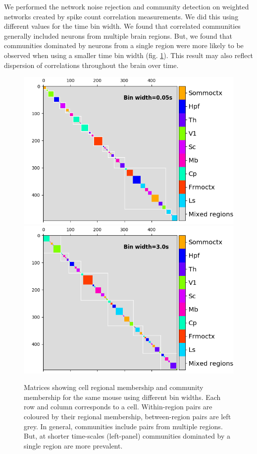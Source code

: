 \documentclass[a4paper,12pt]{article}
\theoremstyle{definition}
\begin{document}
We performed the network noise rejection and community detection on weighted networks created by spike count correlation measurements. We did this using different values for the time bin width. We found that correlated communities generally included neurons from multiple brain regions. But, we found that communities dominated by neurons from a single region were more likely to be observed when using a smaller time bin width (fig. \ref{fig:regional_cluster_maps}). This result may also reflect dispersion of correlations throughout the brain over time.

\begin{figure}[t!]
    \centering
    \includegraphics[width=0.45\columnwidth]{images/Krebs_0p05_regional_cluster_map.png}
    \includegraphics[width=0.45\columnwidth]{images/Krebs_3p0_regional_cluster_map.png}
    \vspace{-0.3cm}
    \caption{Matrices showing cell regional membership and community membership for the same mouse using different bin widths. Each row and column corresponds to a cell. Within-region pairs are coloured by their regional membership, between-region pairs are left grey. In general, communities include pairs from multiple regions. But, at shorter time-scales (left-panel) communities dominated by a single region are more prevalent.}
    \vspace{-0.1cm}
    \label{fig:regional_cluster_maps}
\end{figure}


\vspace{-0.5cm}


\end{document}
